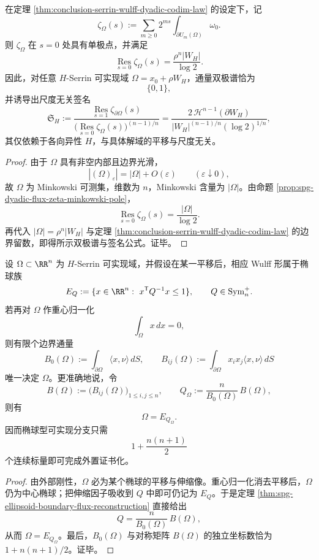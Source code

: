 \begin{corollary}[可实现域的双极谱与尺度无关签名]\label{cor:conclusion-serrin-wulff-dual-pole-scale-signature}
在定理 \ref{thm:conclusion-serrin-wulff-dyadic-codim-law} 的设定下，记
\[
\zeta_{\Omega}(s):=\sum_{m\ge 0}2^{ms}\int_{\partial U_m(\Omega)}\omega_0.
\]
则 \(\zeta_{\Omega}\) 在 \(s=0\) 处具有单极点，并满足
\[
\operatorname*{Res}_{s=0}\zeta_{\Omega}(s)
=
\frac{\rho^n|W_H|}{\log 2}.
\]
因此，对任意 \(H\)-Serrin 可实现域 \(\Omega=x_0+\rho W_H\)，通量双极谱恰为
\[
\{0,1\},
\]
并诱导出尺度无关签名
\[
\mathfrak S_H
:=
\frac{\operatorname*{Res}_{s=1}\zeta_{\partial\Omega}(s)}
{\bigl(\operatorname*{Res}_{s=0}\zeta_{\Omega}(s)\bigr)^{(n-1)/n}}
=
\frac{2\,\mathcal H^{n-1}(\partial W_H)}
{|W_H|^{(n-1)/n}(\log 2)^{1/n}},
\]
其仅依赖于各向异性 \(H\)，与具体解域的平移与尺度无关。
\end{corollary}
\begin{proof}
由于 \(\Omega\) 具有非空内部且边界光滑，
\[
|(\Omega)_\varepsilon|=|\Omega|+O(\varepsilon)
\qquad(\varepsilon\downarrow 0),
\]
故 \(\Omega\) 为 Minkowski 可测集，维数为 \(n\)，Minkowski 含量为 \(|\Omega|\)。由命题 \ref{prop:spg-dyadic-flux-zeta-minkowski-pole}，
\[
\operatorname*{Res}_{s=0}\zeta_{\Omega}(s)=\frac{|\Omega|}{\log 2}.
\]
再代入 \(|\Omega|=\rho^n|W_H|\) 与定理 \ref{thm:conclusion-serrin-wulff-dyadic-codim-law} 的边界留数，即得所示双极谱与签名公式。证毕。
\end{proof}

\begin{theorem}\label{thm:conclusion-serrin-ellipsoid-branch-finite-flux-completeness}
设 \(\Omega\subset\RR^n\) 为 \(H\)-Serrin 可实现域，并假设在某一平移后，相应 Wulff 形属于椭球族
\[
E_Q:=\{x\in\RR^n:\ x^{\mathsf T}Q^{-1}x\le 1\},
\qquad
Q\in\mathrm{Sym}_n^{+}.
\]
若再对 \(\Omega\) 作重心归一化
\[
\int_\Omega x\,dx=0,
\]
则有限个边界通量
\[
B_0(\Omega):=\int_{\partial\Omega}\langle x,\nu\rangle\,dS,
\qquad
B_{ij}(\Omega):=\int_{\partial\Omega}x_i x_j\langle x,\nu\rangle\,dS
\]
唯一决定 \(\Omega\)。更准确地说，令
\[
B(\Omega):=\bigl(B_{ij}(\Omega)\bigr)_{1\le i,j\le n},
\qquad
Q_\Omega:=\frac{n}{B_0(\Omega)}\,B(\Omega),
\]
则有
\[
\Omega=E_{Q_\Omega}.
\]
因而椭球型可实现分支只需
\[
1+\frac{n(n+1)}{2}
\]
个连续标量即可完成外置证书化。
\end{theorem}
\begin{proof}
由外部刚性，\(\Omega\) 必为某个椭球的平移与伸缩像。重心归一化消去平移后，\(\Omega\) 仍为中心椭球；把伸缩因子吸收到 \(Q\) 中即可仍记为 \(E_Q\)。于是定理 \ref{thm:spg-ellipsoid-boundary-flux-reconstruction} 直接给出
\[
Q=\frac{n}{B_0(\Omega)}\,B(\Omega),
\]
从而 \(\Omega=E_{Q_\Omega}\)。最后，\(B_0(\Omega)\) 与对称矩阵 \(B(\Omega)\) 的独立坐标数恰为 \(1+n(n+1)/2\)。证毕。
\end{proof}

